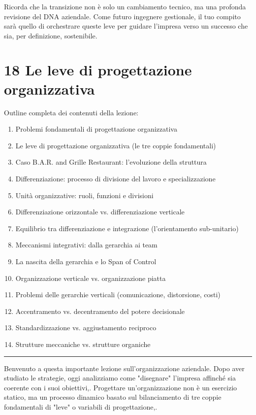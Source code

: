 \documentclass[a4paper,10pt]{article}
\begin{document}
Ricorda che la transizione non è solo un cambiamento tecnico, ma una profonda revisione del DNA aziendale. Come futuro ingegnere gestionale, il tuo compito sarà quello di orchestrare queste leve per guidare l'impresa verso un successo che sia, per definizione, sostenibile.

\section*{18 Le leve di progettazione organizzativa}

Outline completa dei contenuti della lezione:
{\small
\begin{enumerate}
\item Problemi fondamentali di progettazione organizzativa
\item Le leve di progettazione organizzativa (le tre coppie fondamentali)
\item Caso B.A.R. and Grille Restaurant: l'evoluzione della struttura
\item Differenziazione: processo di divisione del lavoro e specializzazione
\item Unità organizzative: ruoli, funzioni e divisioni
\item Differenziazione orizzontale vs. differenziazione verticale
\item Equilibrio tra differenziazione e integrazione (l'orientamento sub-unitario)
\item Meccanismi integrativi: dalla gerarchia ai team
\item La nascita della gerarchia e lo Span of Control
\item Organizzazione verticale vs. organizzazione piatta
\item Problemi delle gerarchie verticali (comunicazione, distorsione, costi)
\item Accentramento vs. decentramento del potere decisionale
\item Standardizzazione vs. aggiustamento reciproco
\item Strutture meccaniche vs. strutture organiche
\end{enumerate}
}
\hrule
\vspace{0.5cm}

Benvenuto a questa importante lezione sull'organizzazione aziendale. Dopo aver studiato le strategie, oggi analizziamo come "disegnare" l'impresa affinché sia coerente con i suoi obiettivi,. Progettare un'organizzazione non è un esercizio statico, ma un processo dinamico basato sul bilanciamento di tre coppie fondamentali di "leve" o variabili di progettazione,.
\end{document}
